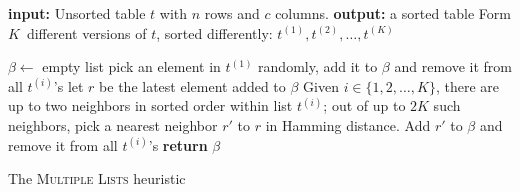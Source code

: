 \documentclass[11pt]{article}
\begin{document}
\begin{algorithm}
{
\begin{algorithmic}[1]
\STATE \textbf{input:}  Unsorted table $t$ with $n$ rows and $c$ columns.
\STATE \textbf{output:} a sorted table
\STATE Form
$K$~different versions of $t$, sorted differently: $t^{(1)},t^{(2)},\dots, t^{(K)}$ 

\STATE $\beta \leftarrow $ empty list
\STATE pick an element in $t^{(1)}$ randomly, add it to $\beta$ and remove it from all $t^{(i)}$'s
\STATE let $r$ be the latest element added to $\beta$
\STATE Given $i\in \{1,2,\dots,K\}$, there are up to two neighbors in sorted order within list $t^{(i)}$; out of up to $2K$ such neighbors, pick a nearest neighbor $r'$ to $r$ in Hamming distance.
\STATE Add $r'$ to $\beta$ and remove it from all $t^{(i)}$'s
\ENDWHILE
\STATE \textbf{return} $\beta$
\end{algorithmic}
}
\caption{\label{algo:multiplelists}The \textsc{Multiple Lists} heuristic}

\end{algorithm}
\end{document}

